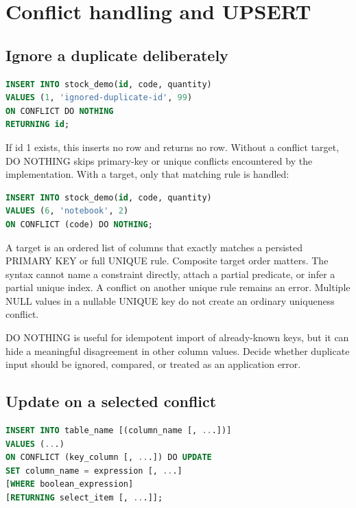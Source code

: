 
\section{Conflict handling and UPSERT}
\label{sql:upsert}

\subsection{Ignore a duplicate deliberately}

\begin{lstlisting}[language=SQL]
INSERT INTO stock_demo(id, code, quantity)
VALUES (1, 'ignored-duplicate-id', 99)
ON CONFLICT DO NOTHING
RETURNING id;
\end{lstlisting}

If id 1 exists, this inserts no row and returns no row. Without a conflict target, DO NOTHING skips primary-key or unique conflicts encountered by the implementation. With a target, only that matching rule is handled:

\begin{lstlisting}[language=SQL]
INSERT INTO stock_demo(id, code, quantity)
VALUES (6, 'notebook', 2)
ON CONFLICT (code) DO NOTHING;
\end{lstlisting}

A target is an ordered list of columns that exactly matches a persisted PRIMARY KEY or full UNIQUE rule. Composite target order matters. The syntax cannot name a constraint directly, attach a partial predicate, or infer a partial unique index. A conflict on another unique rule remains an error. Multiple NULL values in a nullable UNIQUE key do not create an ordinary uniqueness conflict.

DO NOTHING is useful for idempotent import of already-known keys, but it can hide a meaningful disagreement in other column values. Decide whether duplicate input should be ignored, compared, or treated as an application error.

\subsection{Update on a selected conflict}

\begin{lstlisting}[language=SQL]
INSERT INTO table_name [(column_name [, ...])]
VALUES (...)
ON CONFLICT (key_column [, ...]) DO UPDATE
SET column_name = expression [, ...]
[WHERE boolean_expression]
[RETURNING select_item [, ...]];
\end{lstlisting}

